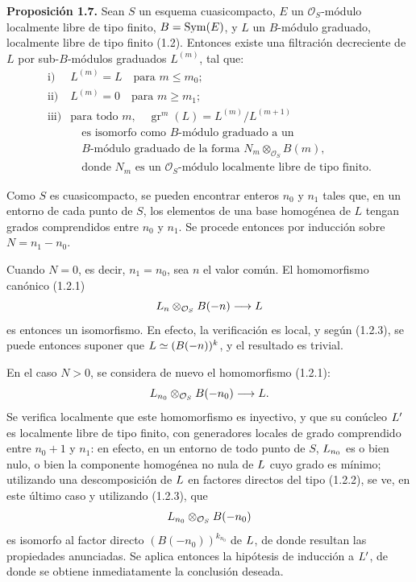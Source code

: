 \textbf{Proposición 1.7.} Sean \(S\) un esquema cuasicompacto, \(E\) un \(\mathcal O_S\)-módulo localmente libre de tipo finito, \(B=\Sym(E)\), y \(L\) un \(B\)-módulo graduado, localmente libre de tipo finito (1.2). Entonces existe una filtración decreciente de \(L\) por sub-\(B\)-módulos graduados \(L^{(m)}\), tal que:
\[
\begin{array}{ll}
\text{i)}& L^{(m)}=L\quad\text{para }m\leq m_0;\\[1mm]
\text{ii)}& L^{(m)}=0\quad\text{para }m\geq m_1;\\[1mm]
\text{iii)}& \text{para todo }m,\quad \operatorname{gr}^m(L)=L^{(m)}/L^{(m+1)}\\
&\quad \text{es isomorfo como }B\text{-módulo graduado a un}\\
&\quad B\text{-módulo graduado de la forma }N_m\otimes_{\mathcal O_S}B(m),\\
&\quad \text{donde }N_m\text{ es un }\mathcal O_S\text{-módulo localmente libre de tipo finito.}
\end{array}
\]

Como \(S\) es cuasicompacto, se pueden encontrar enteros \(n_0\) y \(n_1\) tales que, en un entorno de cada punto de \(S\), los elementos de una base homogénea de \(L\) tengan grados comprendidos entre \(n_0\) y \(n_1\). Se procede entonces por inducción sobre \(N=n_1-n_0\).

Cuando \(N=0\), es decir, \(n_1=n_0\), sea \(n\) el valor común. El homomorfismo canónico (1.2.1)
\[
  \sisi{M_n}{L_n}\otimes_{\mathcal O_S}B(-n)\longrightarrow \sisi{M}{L}
\]
es entonces un isomorfismo. En efecto, la verificación es local, y según (1.2.3), se puede entonces suponer que \(\sisi{M}{L}\simeq(B(-n))^k\), y el resultado es trivial.

En el caso \(N>0\), se considera de nuevo el homomorfismo (1.2.1):
\[
  \sisi{M_{n_0}}{L_{n_0}}\otimes_{\mathcal O_S}B(-n_0)\longrightarrow \sisi{M}{L}.
\]
Se verifica localmente que este homomorfismo es inyectivo, y que su conúcleo \(\sisi{M'}{L'}\) es localmente libre de tipo finito, con generadores locales de grado comprendido entre \(n_0+1\) y \(n_1\): en efecto, en un entorno de todo punto de \(S\), \(\sisi{M_{n_0}}{L_{n_0}}\) es o bien nulo, o bien la componente homogénea no nula de \(\sisi{M}{L}\) cuyo grado es mínimo; utilizando una descomposición de \(\sisi{M}{L}\) en factores directos del tipo (1.2.2), se ve, en este último caso y utilizando (1.2.3), que
\[
  \sisi{M_{n_0}}{L_{n_0}}\otimes_{\mathcal O_S}B(-n_0)
\]
es isomorfo al factor directo \((B(-n_0))^{k_{n_0}}\) de \(\sisi{M}{L}\), de donde resultan las propiedades anunciadas. Se aplica entonces la hipótesis de inducción a \(\sisi{M'}{L'}\), de donde se obtiene inmediatamente la conclusión deseada.

